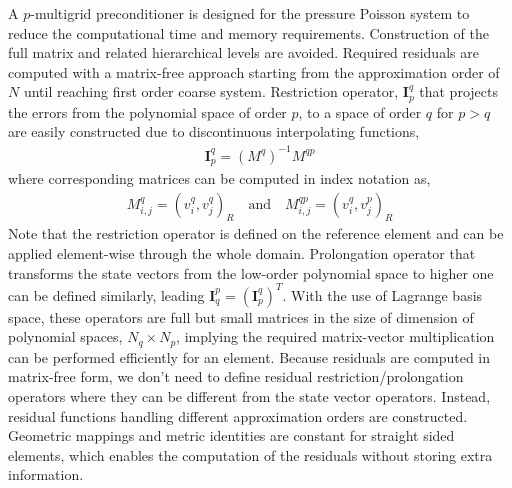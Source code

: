 \documentclass[11pt,a4paper,twoside]{article}
\begin{document}
	A $ p $-multigrid preconditioner is designed for the pressure Poisson system  to reduce the computational time and memory requirements. Construction of the full matrix and related hierarchical levels are avoided. Required residuals are computed with a matrix-free approach starting from the approximation order of $ N $ until reaching first order coarse system. Restriction operator, $ \mathbf{I}_p^q $ that projects the errors from the polynomial space of order $p$,  to a space of order $q $ for $ p>q $ are  easily constructed  due to discontinuous interpolating functions,
	\begin{equation}
	\begin{aligned}
	\mathbf{I}_p^q = (M^q)^{-1}M^{qp}
	\end{aligned}
	\end{equation}
	where corresponding  matrices can be computed in index notation as,
	\begin{equation}
	\begin{aligned}
	M_{i,j}^q = (v_{i}^q, v_{j}^q)_{R}\quad \text{and}\quad M_{i,j}^{qp} = (v_{i}^q, v_{j}^p)_{R}
	\end{aligned}
	\end{equation}    
	Note that the restriction operator is defined on the reference element and can be applied element-wise through the whole domain.  Prolongation operator that transforms the state vectors  from the low-order polynomial space to higher one can be defined similarly, leading $  \mathbf{I}_q^p = (\mathbf{I}_p^q)^T$.  With the use of Lagrange basis space, these operators are full but small matrices in the size of dimension of polynomial spaces, $ N_q\times N_{p} $, implying the required matrix-vector multiplication can be performed efficiently for an element. Because residuals are computed in matrix-free form, we don't need to define residual restriction/prolongation  operators where they can be different from the state vector operators. Instead, residual functions handling different approximation orders are constructed. Geometric mappings and metric identities are constant for straight sided elements, which enables the computation of the residuals without storing extra information. 
	
\end{document}

